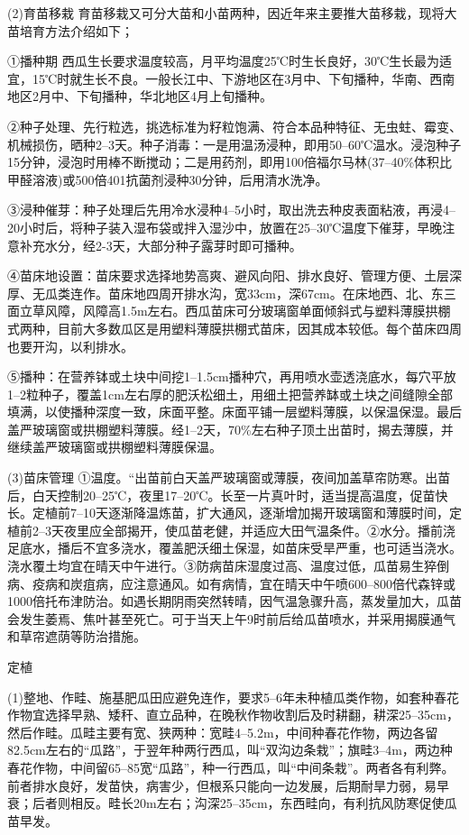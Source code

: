 \documentclass{ctexbook}
\begin{document}
(2)育苗移栽 育苗移栽又可分大苗和小苗两种，因近年来主要推大苗移栽，现将大苗培育方法介绍如下；

①播种期 西瓜生长要求温度较高，月平均温度25℃时生长良好，30℃生长最为适宜，15℃时就生长不良。一般长江中、下游地区在3月中、下旬播种，华南、西南地区2月中、下旬播种，华北地区4月上旬播种。

②种子处理、先行粒选，挑选标准为籽粒饱满、符合本品种特征、无虫蛀、霉变、机械损伤，晒种2--3天。种子消毒：一是用温汤浸种，即用50--60℃温水。浸泡种子15分钟，浸泡时用棒不断搅动；二是用药剂，即用100倍福尔马林(37--40\%体积比甲醛溶液)或500倍401抗菌剂浸种30分钟，后用清水洗净。

③浸种催芽：种子处理后先用冷水浸种4--5小时，取出洗去种皮表面粘液，再浸4--20小时后，将种子装入湿布袋或拌入湿沙中，放置在25--30℃温度下催芽，早晚注意补充水分，经2-3天，大部分种子露芽时即可播种。

④苗床地设置：苗床要求选择地势高爽、避风向阳、排水良好、管理方便、土层深厚、无瓜类连作。苗床地四周开排水沟，宽33cm，深67cm。在床地西、北、东三面立草风障，风障高1.5m左右。西瓜苗床可分玻璃窗单面倾斜式与塑料薄膜拱棚式两种，目前大多数瓜区是用塑料薄膜拱棚式苗床，因其成本较低。每个苗床四周也要开沟，以利排水。

⑤播种：在营养钵或土块中间挖1--1.5cm播种穴，再用喷水壶透浇底水，每穴平放1--2粒种子，覆盖1cm左右厚的肥沃松细土，用细土把营养缽或土块之间缝隙全部填满，以使播种深度一致，床面平整。床面平铺一层塑料薄膜，以保温保湿。最后盖严玻璃窗或拱棚塑料薄膜。经1--2天，70\%左右种子顶土出苗时，揭去薄膜，并继续盖严玻璃窗或拱棚塑料薄膜保温。

(3)苗床管理
①温度。“出苗前白天盖严玻璃窗或薄膜，夜间加盖草帘防寒。出苗后，白天控制20--25℃，夜里17--20℃。长至一片真叶时，适当提高温度，促苗快长。定植前7--10天逐渐降温炼苗，扩大通风，逐渐增加揭开玻璃窗和薄膜时间，定植前2--3天夜里应全部揭开，使瓜苗老健，并适应大田气温条件。②水分。播前浇足底水，播后不宜多浇水，覆盖肥沃细土保湿，如苗床受旱严重，也可适当浇水。浇水覆土均宜在晴天中午进行。③防病苗床湿度过高、温度过低，瓜苗易生猝倒病、疫病和炭疽病，应注意通风。如有病情，宜在晴天中午喷600--800倍代森锌或1000倍托布津防治。如遇长期阴雨突然转晴，因气温急骤升高，蒸发量加大，瓜苗会发生萎焉、焦叶甚至死亡。可于当天上午9时前后给瓜苗喷水，并采用揭膜通气和草帘遮荫等防治措施。

定植 

(1)整地、作畦、施基肥瓜田应避免连作，要求5--6年未种植瓜类作物，如套种春花作物宜选择早熟、矮秆、直立品种，在晚秋作物收割后及时耕翻，耕深25--35cm，然后作畦。瓜畦主要有宽、狭两种：宽畦4--5.2m，中间种春花作物，两边各留82.5cm左右的“瓜路”，于翌年种两行西瓜，叫“双沟边条栽”；旗畦3--4m，两边种春花作物，中间留65--85宽“瓜路”，种一行西瓜，叫“中间条栽”。两者各有利弊。前者排水良好，发苗快，病害少，但根系只能向一边发展，后期耐旱力弱，易早衰；后者则相反。畦长20m左右；沟深25--35cm，东西畦向，有利抗风防寒促使瓜苗早发。
\end{document}

